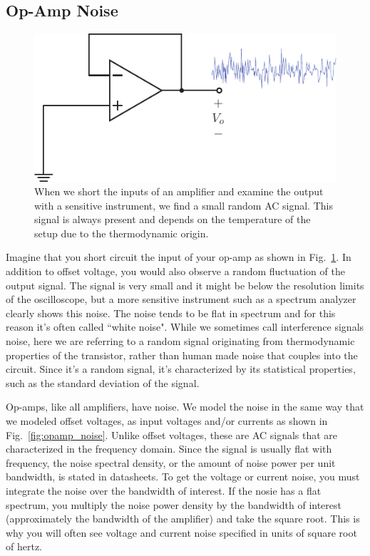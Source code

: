 \subsection{Op-Amp Noise}
\begin{figure}[tb]
\begin{center}
\includegraphics[scale=1]{opamp_unitygain_noise}
\end{center}
\caption{When we short the inputs of an amplifier and examine the output with a sensitive instrument, we find a small random AC signal.  This signal is always present and depends on the temperature of the setup due to the thermodynamic origin.}
\label{fig:opamp_unitygain_noise}
\end{figure}

Imagine that you short circuit the input of your op-amp as shown in Fig.~\ref{fig:opamp_unitygain_noise}. In addition to offset voltage, you would also observe a random fluctuation of the output signal.  The signal is very small and it might be below the resolution limits of the oscilloscope, but a more sensitive instrument such as a spectrum analyzer clearly shows this noise.  The noise tends to be flat in spectrum and for this reason it's often called ``white noise".  While we sometimes call interference signals noise, here we are referring to a random signal originating from thermodynamic properties of the transistor, rather than human made noise that couples into the circuit.   Since it's a random signal, it's characterized by its statistical properties, such as the standard deviation of the signal.  

Op-amps, like all amplifiers, have noise.  We model the noise in the same way that we modeled offset voltages, as input voltages and/or currents as shown in Fig.~\ref{fig:opamp_noise}.  Unlike offset voltages, these are AC signals that are characterized in the frequency domain.  Since the signal is usually flat with frequency, the noise spectral density, or the amount of noise power per unit bandwidth, is stated in datasheets.  To get the voltage or current noise, you must integrate the noise over the bandwidth of interest.  If the nosie has a flat spectrum, you multiply the noise power density by the bandwidth of interest (approximately the bandwidth of the amplifier) and take the square root.  This is why you will often see voltage and current noise specified in units of square root of hertz.

